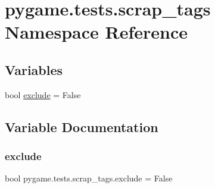 \hypertarget{namespacepygame_1_1tests_1_1scrap__tags}{}\section{pygame.\+tests.\+scrap\+\_\+tags Namespace Reference}
\label{namespacepygame_1_1tests_1_1scrap__tags}
\subsection*{Variables}
\begin{DoxyCompactItemize}
\item 
bool \hyperlink{namespacepygame_1_1tests_1_1scrap__tags_a374e004e4969ccbb3b778acbb25075c2}{exclude} = False
\end{DoxyCompactItemize}


\subsection{Variable Documentation}
\mbox{\label{namespacepygame_1_1tests_1_1scrap__tags_a374e004e4969ccbb3b778acbb25075c2}} 
\subsubsection{\texorpdfstring{exclude}{exclude}}
{\footnotesize\ttfamily bool pygame.\+tests.\+scrap\+\_\+tags.\+exclude = False}

